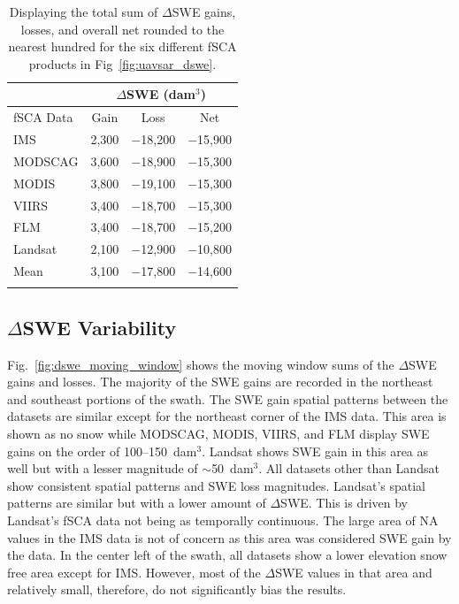 \begin{table}
\centering
\caption{Displaying the total sum of $\Delta$SWE gains, losses, and overall net rounded to the nearest hundred for the six different fSCA products in Fig~\ref{fig:uavsar_dswe}.}
\begin{tabular}{lccc}
\toprule
& \multicolumn{3}{c}{$\Delta$SWE (dam$^{3}$)} \\
\midrule
fSCA Data & Gain & Loss & Net \\
\midrule
IMS & 2,300 & $-$18,200 & $-$15,900 \\
MODSCAG & 3,600 & $-$18,900 & $-$15,300 \\
MODIS & 3,800 & $-$19,100 & $-$15,300 \\
VIIRS & 3,400 & $-$18,700 & $-$15,300 \\
FLM & 3,400 & $-$18,700 & $-$15,200 \\
Landsat & 2,100 & $-$12,900 & $-$10,800 \\
\midrule
Mean & 3,100 & $-$17,800 & $-$14,600 \\
\bottomrule
\label{tab:dswe_stats}
\end{tabular}
\end{table}



\hypertarget{ch4-results}{\subsection{$\Delta$SWE Variability}\label{ch4-results}}

Fig.~\ref{fig:dswe_moving_window} shows the moving window sums of the $\Delta$SWE gains and losses. The majority of the SWE gains are recorded in the northeast and southeast portions of the swath. The SWE gain spatial patterns between the datasets are similar except for the northeast corner of the IMS data. This area is shown as no snow while MODSCAG, MODIS, VIIRS, and FLM display SWE gains on the order of 100--150~dam$^{3}$. Landsat shows SWE gain in this area as well but with a lesser magnitude of $\sim$50~dam$^{3}$. All datasets other than Landsat show consistent spatial patterns and SWE loss magnitudes. Landsat's spatial patterns are similar but with a lower amount of $\Delta$SWE. This is driven by Landsat's fSCA data not being as temporally continuous. The large area of NA values in the IMS data is not of concern as this area was considered SWE gain by the data. In the center left of the swath, all datasets show a lower elevation snow free area except for IMS. However, most of the $\Delta$SWE values in that area and relatively small, therefore, do not significantly bias the results.

